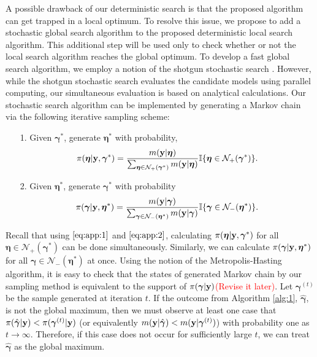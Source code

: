 \documentclass[12pt]{article}
\def\uy{{\bf y}}
\def\bg{{\boldsymbol \gamma}}
\def\ueta{{\boldsymbol \eta}}
\def\ueta{{\boldsymbol \eta}}
\begin{document}
A possible drawback of our deterministic search is that the proposed algorithm can get trapped in a local optimum. To resolve this issue, we propose to add a stochastic global search algorithm to the proposed deterministic local search algorithm. This additional step will be used only to check whether or not the local search algorithm reaches the global optimum. To develop a fast global search algorithm, we employ a notion of the shotgun stochastic search \citep{hans2007shotgun}. However, while the shotgun stochastic search evaluates the candidate models using parallel computing, our simultaneous evaluation is based on analytical calculations. Our stochastic search algorithm can be implemented by generating a Markov chain via the following iterative sampling scheme:
\begin{itemize}
\item[1.] Given $\bg^*$, generate $\ueta^*$ with probability,
$$\pi(\ueta|\uy,\bg^*)=\frac{m(\uy|\ueta)}{\sum_{\ueta \in \mathcal{N}_+(\bg^* )  } m(\uy|\ueta) }\mathbb{I}\{\ueta \in \mathcal{N}_+(\bg^* ) \}.$$
\item[2.] Given $\ueta^*$, generate $\bg^*$ with probability
$$\pi(\bg|\uy,\ueta^*)=\frac{m(\uy|\bg)}{\sum_{\bg \in \mathcal{N}_-({\ueta}^* )  } m(\uy|\bg) }\mathbb{I}\{\bg \in \mathcal{N}_-({\ueta}^* )   \}.$$
\end{itemize}
Recall that  using $\eqref{eq:app:1}$ and  $\eqref{eq:app:2}$, calculating $\pi(\ueta|\uy,\bg^*)$ for all $\ueta \in \mathcal{N}_+(\bg^* )$ can be done simultaneously. Similarly, we can calculate $\pi(\bg|\uy,\ueta^*)$ for all $\bg \in \mathcal{N}_-({\ueta}^* ) $ at once.   
Using the notion of the Metropolis-Hasting algorithm, it is easy to check that the states of generated Markov chain by our sampling method is equivalent to the support of $\pi(\bg|\uy)$\textcolor{red}{(Revise it later)}. Let $\bg^{(t)}$ be the sample generated at iteration $t$. If the outcome from Algorithm \ref{alg:1}, $\hat{\bg}$, is not the global maximum, then we must observe at least one case that $\pi(\hat{\bg}|\uy)< \pi(\bg^{(t)}|\uy)$ (or equivalently $m(\uy|\hat{\bg})<m(\uy|\bg^{(t)})$) with probability one as $t\to \infty$. Therefore, if this case does not occur for sufficiently large $t$, we can treat $\hat{\bg}$ as the global maximum.
\end{document}

